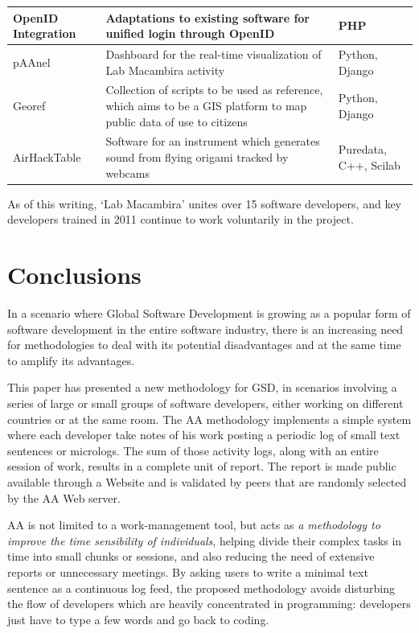 \documentclass{article}
\begin{document}
\begin{table}
{\begin{tabular}{|l|p{5cm}|l|}
        \hline
        OpenID Integration & Adaptations to existing software for
        unified login through OpenID & PHP \\
        \hline
        pAAnel & Dashboard for the real-time visualization of Lab
        Macambira activity & Python, Django \\
        \hline
        Georef & Collection of scripts to be used as reference, which
        aims to be a GIS platform to map public data of use to
        citizens & Python, Django \\
        \hline
        AirHackTable & Software for an instrument which generates
        sound from flying origami tracked by webcams & Puredata,
        C++, Scilab \\
        \hline
        \end{tabular}}
    \label{tabela:criados}
\end{table}

As of this writing, `Lab Macambira' unites over 15 software developers, and 
key developers trained in 2011 continue to work voluntarily in the project.

\section{Conclusions}
\label{conclusions}

In a scenario where Global Software Development is growing as a popular form of
software development in the entire software industry, there is an increasing
need for methodologies to deal with its potential disadvantages and at the same
time to amplify its advantages.

This paper has presented a new methodology for GSD, in scenarios
involving a series of large or small groups of software developers, either working on
different countries or at the same room. The AA methodology
implements a simple system where each developer take notes of his work
posting a periodic log of small text sentences or micrologs. The sum of those
activity logs, along with an entire session of work, results in a complete
unit of report. The report is made public available through a Website and is
validated by peers that are randomly selected by the AA Web server.

AA is not limited to a work-management tool, but acts as \emph{a
methodology to improve the time sensibility of individuals}, helping divide their
complex tasks in time into small chunks or sessions, and also reducing the need
of extensive reports or unnecessary meetings. By asking users to write a minimal
text sentence as a continuous log feed, the proposed methodology avoids
disturbing the flow of developers which are heavily concentrated in programming:
developers just have to type a few words and go back to coding.
\end{document}
